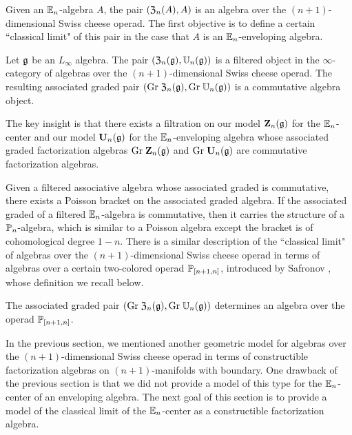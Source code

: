 \documentclass[11pt]{amsart}
\numberwithin{equation}{section}
\begin{document}
Given an $\mathbb E_n$-algebra $A$, the pair $(\mathfrak Z_n (A) , A)$ is an algebra over the $(n+1)$-dimensional Swiss cheese operad. 
The first objective is to define a certain ``classical limit" of this pair in the case that $A$ is an $\mathbb E_n$-enveloping algebra. 

\begin{prp} \label{prp:swiss1}
Let $\mathfrak g$ be an $L_\infty$ algebra. 
The pair $(\mathfrak Z_n(\mathfrak g) , \mathbb U_n(\mathfrak g))$ is a filtered object in the $\infty$-category of algebras over the $(n+1)$-dimensional Swiss cheese operad. 
The resulting associated graded pair $({\rm Gr} \; \mathfrak Z_n(\mathfrak g) , {\rm Gr} \; \mathbb U_n(\mathfrak g))$ is a commutative algebra object.
\end{prp}

The key insight is that there exists a filtration on our model $\mathbf Z_n(\mathfrak g)$ for the $\mathbb E_n$-center and our model $\mathbf U_n (\mathfrak g)$ for the $\mathbb E_n$-enveloping algebra  whose associated graded factorization algebras ${\rm Gr} \; \mathbf Z_n(\mathfrak g)$ and ${\rm Gr} \; \mathbf U_n(\mathfrak g)$ are commutative factorization algebras. 

Given a filtered associative algebra whose associated graded is commutative, there exists a Poisson bracket on the associated graded algebra. 
If the associated graded of a filtered $\mathbb E_n$-algebra is commutative, then it carries the structure of a $\mathbb P_n$-algebra, which is similar to a Poisson algebra except the bracket is of cohomological degree $1-n$. 
There is a similar description of the ``classical limit"  of algebras over the $(n+1)$-dimensional Swiss cheese operad in terms of algebras over a certain two-colored operad $\mathbb P_{[n+1,n]}$, introduced by Safronov \cite{Pavel1, Pavel2}, whose definition we recall below.

\begin{prp} 
\label{prp:poisson}
The associated graded pair $({\rm Gr} \; \mathfrak Z_n(\mathfrak g) , {\rm Gr} \; \mathbb U_n(\mathfrak g))$ determines an algebra over the operad $\mathbb P_{[n+1,n]}$. 
\end{prp}



In the previous section, we mentioned another geometric model for algebras over the $(n+1)$-dimensional Swiss cheese operad in terms of constructible factorization algebras on $(n+1)$-manifolds with boundary.
One drawback of the previous section is that we did not provide a model of this type for the $\mathbb E_n$-center of an enveloping algebra. 
The next goal of this section is to provide a model of the classical limit of the $\mathbb E_n$-center as a constructible factorization algebra. 
\end{document}
